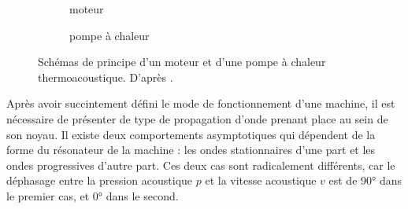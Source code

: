 \begin{figure}[!ht]
	\centering
	\begin{subfigure}{.47\textwidth}
		\centering
		
		\caption{moteur}
		\label{fig:MoteurTA}
	\end{subfigure}
	\hfill%
	\begin{subfigure}{.47\textwidth}
		\centering
		
		\caption{pompe à chaleur}
		\label{fig:FrigoTA}
	\end{subfigure}
	\caption[Schémas de principe d'un moteur et d'une pompe à chaleur thermoacoustique]{Schémas de principe d'un moteur et d'une pompe à chaleur thermoacoustique. D'après \cite{swift_thermoacoustics_2017}.}
	\label{fig:MoteurVSFrigoTA}
\end{figure}

Après avoir succintement défini le mode de fonctionnement d'une machine, il est nécessaire de présenter de type de propagation d'onde prenant place au sein de son noyau. Il existe deux comportements asymptotiques qui dépendent de la forme du résonateur de la machine : les ondes stationnaires d'une part et les ondes progressives d'autre part. Ces deux cas sont radicalement différents, car le déphasage entre la pression acoustique $p$ et la vitesse acoustique $v$ est de \ang{90} dans le premier cas, et \ang{0} dans le second.

%    	
%	    

